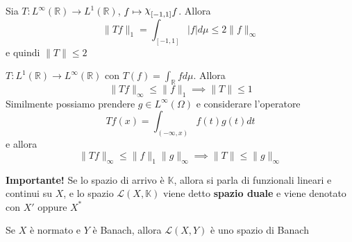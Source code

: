 \begin{example}
    Sia \(T : L^{\infty}{(\mathbb{R})} \to L^{1}{(\mathbb{R})}\), \(f \mapsto
    \rchi_{[-1, 1]}f \). Allora
    \[
        \|Tf\|_1 = \int_{[-1, 1]}  |f| d\mu \le 2 \|f\|_{\infty} 
    \]
    e quindi \(\|T\| \le 2\) 
\end{example}
\begin{example}
    \(T : L^{1}{(\mathbb{R})} \to L^{\infty}{(\mathbb{R})}\) con \(T{(f)} =
    \int_{\mathbb{R}} f d\mu\). Allora
    \[
        \|Tf\|_{\infty} \le \|f\|_1 \implies \|T\| \le 1
    \]
    Similmente possiamo prendere \(g \in L^{\infty}{(\Omega)}\) e considerare
    l'operatore
    \[
        Tf{(x)} = \int_{(-\infty, x)} f{(t)}g{(t)}dt
    \]
    e allora
    \[
        \|Tf\|_{\infty} \le \|f\|_1 \|g\|_\infty \implies \|T\| \le \|g\|_\infty
    \]
\end{example}
\textbf{Importante!} Se lo spazio di arrivo è \(\mathbb{K}\), allora si parla di
funzionali lineari e continui su \(X\), e lo spazio \(\mathcal{L}{(X,
\mathbb{K})}\) viene detto \textbf{spazio duale} e viene denotato con \(X'\)
oppure \(X^{*}\) 
\begin{theorem}
    Se \(X\) è normato e \(Y\) è Banach, allora \(\mathcal{L}{(X, Y)}\) è uno
    spazio di Banach
\end{theorem}
